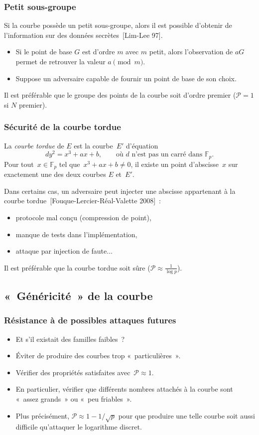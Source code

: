 \documentclass[francais]{beamer}
\newcommand{\F}{\mathbb{F}}
\newcommand{\prob}{\mathcal{P}}
\newcommand{\bib}[1]{{\usebeamercolor{emph}\textcolor{fg}{~[#1]}}}
\begin{document}
\begin{frame}\frametitle{Petit sous-groupe}
Si la courbe possède un petit sous-groupe, alors
il est possible d'obtenir de l'information
sur des données secrètes\bib{Lim-Lee 97}.
\begin{itemize}
\item Si le point de base $G$ est d'ordre $m$ avec $m$ petit,
alors l'observation de $a G$ permet de retrouver la valeur $a \pmod{m}$.
\item Suppose un adversaire capable de fournir un point de base
de son choix.
\end{itemize}
\begin{block}{}
Il est préférable que le groupe des points de la courbe
soit d'ordre premier ($\prob = 1$ si $N$ premier).
\end{block}
\end{frame}
\begin{frame}\frametitle{Sécurité de la courbe tordue}
La \emph{courbe tordue} de $E$ est la courbe~$E'$ d'équation
\[ d y^2 = x^3 + a x + b, \qquad
  \text{où $d$ n'est pas un carré dans~$\F_p$.} \]
Pour tout~$x ∈ \F_p$ tel que~$x^3+ax+b ≠ 0$,
il existe un point d'abscisse~$x$ sur
exactement une des deux courbes $E$ et~$E'$.

Dans certains cas, un adversaire peut injecter une abscisse appartenant
à la courbe tordue\bib{Fouque-Lercier-Réal-Valette 2008} :
\begin{itemize}
\item protocole mal conçu (compression de point),
\item manque de tests dans l'implémentation,
\item attaque par injection de faute...
\end{itemize}

\begin{block}{}
Il est préférable que la courbe tordue soit sûre
($\prob ≈ \frac{1}{\log p}$).
\end{block}
\end{frame}


\subsection{« Généricité » de la courbe}

\begin{frame}\frametitle{Résistance à de possibles attaques futures}
\begin{itemize}
\item Et s'il existait des familles faibles ?
\item Éviter de produire des courbes trop « particulières ».
\item Vérifier des propriétés satisfaites avec~$\prob ≈ 1$.
\item En particulier, vérifier que différents nombres attachés à la
courbe sont « assez grands » ou « peu friables ».
\item Plus précisément, $\prob ≈ 1 - 1/\sqrt{p}$
pour que produire une telle courbe
soit aussi difficile qu'attaquer le logarithme discret.
\end{itemize}
\end{frame}
\end{document}
